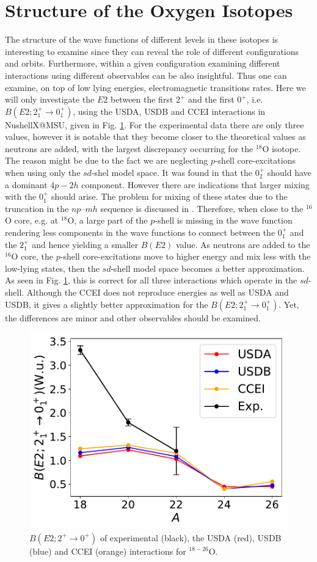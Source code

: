 \documentclass[aps,prl,reprint,groupedaddress]{revtex4-1}  %
\begin{document}
\section{Structure of the Oxygen Isotopes}
The structure of the wave functions of different levels in these isotopes is interesting to examine since they can reveal the role of different configurations and orbits. Furthermore, within a given configuration examining different interactions using different observables can be also insightful. Thus one can examine, on top of low lying energies, electromagnetic transitions rates. Here we will only investigate the $E2$ between the first $2^+$ and the first $0^+$, i.e. $B(E2; 2_1^+ \rightarrow 0_1^+)$, using the USDA, USDB and CCEI interactions in NushellX@MSU, given in Fig. \ref{oxygen-be2}. For the experimental data there are only three values, however it is notable that they become closer to the theoretical values as neutrons are added, with the largest discrepancy occurring for the $^{18}$O isotope. The reason might be due to the fact we are neglecting $p$-shell core-excitations when using only the $sd$-shel model space. It was found in \cite{Lawson1976} that the $0_2^+$ should have a dominant $4p-2h$ component. However there are indications that larger mixing with the $0_1^+$ should arise. The problem for mixing of these states due to the truncation in the $np–mh$ sequence is discussed in \cite{Warburton1992a}. Therefore, when close to the $^{16}$O core, e.g. at $^{18}$O, a large part of the $p$-shell is missing in the wave function rendering less components in the wave functions to connect between the $0_1^+$ and the $2_1^+$ and hence yielding a smaller $B(E2)$ value. As neutrons are added to the $^{16} $O core, the $p$-shell core-excitations move to higher energy and mix less with the low-lying states, then the $sd$-shell model space becomes a better approximation. As seen in Fig. \ref{oxygen-be2}, this is correct for all three interactions which operate in the $sd$-shell. Although the CCEI does not reproduce energies as well as USDA and USDB, it gives a slightly better approximation for the $B(E2; 2_1^+ \rightarrow 0_1^+)$. Yet, the differences are minor and other observables should be examined.

\begin{figure}[h]
\includegraphics[width=1\linewidth]{../figures/oxygen-be2.pdf}
\caption{$B(E2; 2^+ \rightarrow 0^+)$ of experimental (black), the USDA (red), USDB (blue) and CCEI (orange) interactions for $^{18-26}$O. \label{oxygen-be2}}
\end{figure}

\pagebreak

\end{document}

